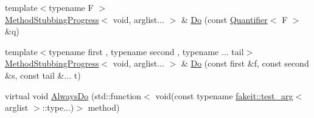 \begin{DoxyCompactItemize}
{\footnotesize template$<$typename F $>$ }\\\mbox{\hyperlink{structfakeit_1_1MethodStubbingProgress}{Method\+Stubbing\+Progress}}$<$ void, arglist... $>$ \& \mbox{\hyperlink{structfakeit_1_1MethodStubbingProgress_3_01void_00_01arglist_8_8_8_01_4_a3091661d404ffecf2733281471d536c4}{Do}} (const \mbox{\hyperlink{structfakeit_1_1Quantifier}{Quantifier}}$<$ F $>$ \&q)
\item 
{\footnotesize template$<$typename first , typename second , typename ... tail$>$ }\\\mbox{\hyperlink{structfakeit_1_1MethodStubbingProgress}{Method\+Stubbing\+Progress}}$<$ void, arglist... $>$ \& \mbox{\hyperlink{structfakeit_1_1MethodStubbingProgress_3_01void_00_01arglist_8_8_8_01_4_a45b048006587b626f8220aa4b196de2a}{Do}} (const first \&f, const second \&s, const tail \&... t)
\item 
virtual void \mbox{\hyperlink{structfakeit_1_1MethodStubbingProgress_3_01void_00_01arglist_8_8_8_01_4_a3e7ae0c7da9cc0eb29d499b889805eb9}{Always\+Do}} (std\+::function$<$ void(const typename \mbox{\hyperlink{structfakeit_1_1test__arg}{fakeit\+::test\+\_\+arg}}$<$ arglist $>$\+::type...)$>$ method)
\end{DoxyCompactItemize}
